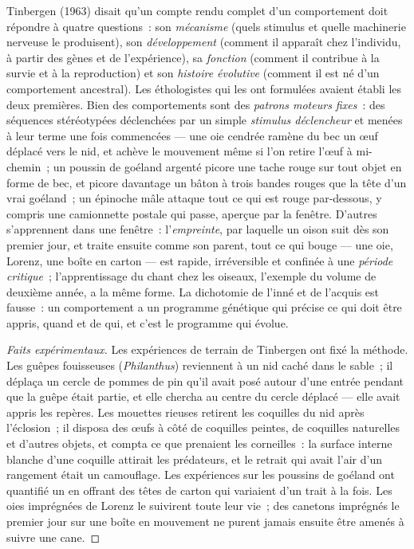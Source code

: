 \begin{definition}\label{def:b3:behavioural-ecology:tinbergen}
Tinbergen (1963) disait qu'un compte rendu complet d'un comportement
doit répondre à quatre questions~: son \emph{mécanisme} (quels stimulus
et quelle machinerie nerveuse le produisent), son \emph{développement}
(comment il apparaît chez l'individu, à partir des gènes et de
l'expérience), sa \emph{fonction} (comment il contribue à la survie et à
la reproduction) et son \emph{histoire évolutive} (comment il est né
d'un comportement ancestral). Les éthologistes qui les ont formulées
avaient établi les deux premières. Bien des comportements sont des
\emph{patrons moteurs fixes}~: des séquences stéréotypées déclenchées
par un simple \emph{stimulus déclencheur} et menées à leur terme une
fois commencées --- une oie cendrée ramène du bec un œuf déplacé vers le
nid, et achève le mouvement même si l'on retire l'œuf à mi-chemin~; un
poussin de goéland argenté picore une tache rouge sur tout objet en
forme de bec, et picore davantage un bâton à trois bandes rouges que la
tête d'un vrai goéland~; un épinoche mâle attaque tout ce qui est rouge
par-dessous, y compris une camionnette postale qui passe, aperçue par la
fenêtre. D'autres s'apprennent dans une fenêtre~: l'\emph{empreinte},
par laquelle un oison suit dès son premier jour, et traite ensuite comme
son parent, tout ce qui bouge --- une oie, Lorenz, une boîte en carton
--- est rapide, irréversible et confinée à une \emph{période critique}~;
l'apprentissage du chant chez les oiseaux, l'exemple du volume de
deuxième année, a la même forme. La dichotomie de l'inné et de l'acquis
est fausse~: un comportement a un programme génétique qui précise ce
qui doit être appris, quand et de qui, et c'est le programme qui évolue.
\end{definition}

\begin{proof}[Faits expérimentaux]
Les expériences de terrain de Tinbergen ont fixé la méthode. Les guêpes
fouisseuses (\emph{Philanthus}) reviennent à un nid caché dans le
sable~; il déplaça un cercle de pommes de pin qu'il avait posé autour
d'une entrée pendant que la guêpe était partie, et elle chercha au
centre du cercle déplacé --- elle avait appris les repères. Les mouettes
rieuses retirent les coquilles du nid après l'éclosion~; il disposa des
œufs à côté de coquilles peintes, de coquilles naturelles et d'autres
objets, et compta ce que prenaient les corneilles~: la surface interne
blanche d'une coquille attirait les prédateurs, et le retrait qui avait
l'air d'un rangement était un camouflage. Les expériences sur les
poussins de goéland ont quantifié un  en offrant des
têtes de carton qui variaient d'un trait à la fois. Les oies imprégnées
de Lorenz le suivirent toute leur vie~; des canetons imprégnés le
premier jour sur une boîte en mouvement ne purent jamais ensuite être
amenés à suivre une cane.
\end{proof}

